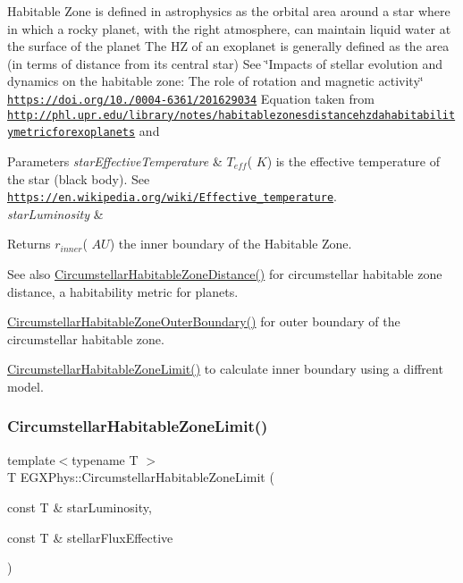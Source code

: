 Habitable Zone is defined in astrophysics as the orbital area around a star where in which a rocky planet, with the right atmosphere, can maintain liquid water at the surface of the planet The HZ of an exoplanet is generally defined as the area (in terms of distance from its central star) See \char`\"{}\+Impacts of stellar evolution and dynamics on the habitable zone\+: The role of rotation and magnetic activity\char`\"{} \href{https://doi.org/10.1051/0004-6361/201629034}{\tt https\+://doi.\+org/10./0004-\/6361/201629034} Equation taken from \href{http://phl.upr.edu/library/notes/habitablezonesdistancehzdahabitabilitymetricforexoplanets}{\tt http\+://phl.\+upr.\+edu/library/notes/habitablezonesdistancehzdahabitabilitymetricforexoplanets} and 
\begin{DoxyParams}{Parameters}
{\em star\+Effective\+Temperature} & $T_{eff}$( $K$) is the effective temperature of the star (black body). See \href{https://en.wikipedia.org/wiki/Effective_temperature}{\tt https\+://en.\+wikipedia.\+org/wiki/\+Effective\+\_\+temperature}. \\
\hline
{\em star\+Luminosity} & \\
\hline
\end{DoxyParams}
\begin{DoxyReturn}{Returns}
$r_{inner}$( $AU$) the inner boundary of the Habitable Zone. 
\end{DoxyReturn}
\begin{DoxySeeAlso}{See also}
\hyperlink{group___astrophysics_gacf3a720793cdb27f6d93b170b44e81be}{Circumstellar\+Habitable\+Zone\+Distance()} for circumstellar habitable zone distance, a habitability metric for planets. 

\hyperlink{group___astrophysics_gaa47fcde814ba8007de800e930fc0a08d}{Circumstellar\+Habitable\+Zone\+Outer\+Boundary()} for outer boundary of the circumstellar habitable zone. 

\hyperlink{group___astrophysics_ga23a8f602461ea3257e8767b1d455c383}{Circumstellar\+Habitable\+Zone\+Limit()} to calculate inner boundary using a diffrent model. 
\end{DoxySeeAlso}
\mbox{\label{group___astrophysics_ga23a8f602461ea3257e8767b1d455c383}} 
\subsubsection{\texorpdfstring{Circumstellar\+Habitable\+Zone\+Limit()}{CircumstellarHabitableZoneLimit()}}
{\footnotesize\ttfamily template$<$typename T $>$ \\
T E\+G\+X\+Phys\+::\+Circumstellar\+Habitable\+Zone\+Limit (\begin{DoxyParamCaption}\item[{const T \&}]{star\+Luminosity,  }\item[{const T \&}]{stellar\+Flux\+Effective }\end{DoxyParamCaption})}



